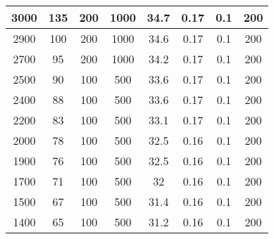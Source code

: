 \documentclass{article}
\begin{document}
\begin{table}[H]
\begin{tabular}{|c|c|c|c|c|c|c|c|}
        3000          & 135                       & 200                       & 1000                      & 34.7       & 0.17                      & 0.1                       & 200                       \\ \hline
        2900          & 100                       & 200                       & 1000                      & 34.6       & 0.17                      & 0.1                       & 200                       \\ \hline
        2700          & 95                        & 200                       & 1000                      & 34.2       & 0.17                      & 0.1                       & 200                       \\ \hline
        2500          & 90                        & 100                       & 500                       & 33.6       & 0.17                      & 0.1                       & 200                       \\ \hline
        2400          & 88                        & 100                       & 500                       & 33.6       & 0.17                      & 0.1                       & 200                       \\ \hline
        2200          & 83                        & 100                       & 500                       & 33.1       & 0.17                      & 0.1                       & 200                       \\ \hline
        2000          & 78                        & 100                       & 500                       & 32.5       & 0.16                      & 0.1                       & 200                       \\ \hline
        1900          & 76                        & 100                       & 500                       & 32.5       & 0.16                      & 0.1                       & 200                       \\ \hline
        1700          & 71                        & 100                       & 500                       & 32         & 0.16                      & 0.1                       & 200                       \\ \hline
        1500          & 67                        & 100                       & 500                       & 31.4       & 0.16                      & 0.1                       & 200                       \\ \hline
        1400          & 65                        & 100                       & 500                       & 31.2       & 0.16                      & 0.1                       & 200                       \\ \hline

\end{tabular}
\end{table}
\end{document}
